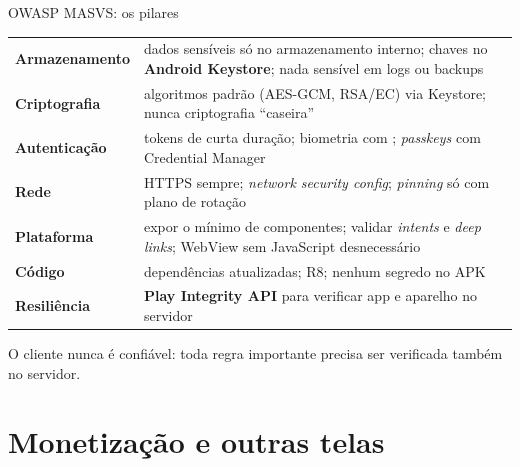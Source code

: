 \documentclass[aspectratio=169,10pt]{beamer}
\begin{document}
\begin{frame}{OWASP MASVS: os pilares}
  \footnotesize
  \begin{tabularx}{\textwidth}{@{}l L@{}}
    \toprule
     &  \\
    \midrule
    \textbf{Armazenamento} & dados sensíveis só no armazenamento interno; chaves no \textbf{Android Keystore}; nada sensível em logs ou backups \\
    \textbf{Criptografia} & algoritmos padrão (AES-GCM, RSA/EC) via Keystore; nunca criptografia ``caseira'' \\
    \textbf{Autenticação} & tokens de curta duração; biometria com ; \emph{passkeys} com Credential Manager \\
    \textbf{Rede} & HTTPS sempre; \emph{network security config}; \emph{pinning} só com plano de rotação \\
    \textbf{Plataforma} & expor o mínimo de componentes; validar \emph{intents} e \emph{deep links}; WebView sem JavaScript desnecessário \\
    \textbf{Código} & dependências atualizadas; R8; nenhum segredo no APK \\
    \textbf{Resiliência} & \textbf{Play Integrity API} para verificar app e aparelho no servidor \\
    \bottomrule
  \end{tabularx}
  \vspace{4pt}
  \begin{destaque}
    O cliente nunca é confiável: toda regra importante precisa ser verificada também no servidor.
  \end{destaque}
\end{frame}

\section{Monetização e outras telas}
\end{document}
